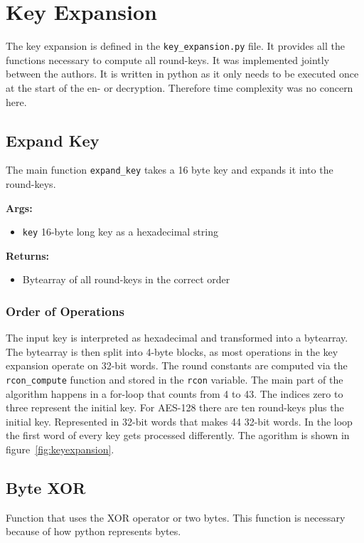 \chapter{Key Expansion}
\label{ch:key_expansion}
The key expansion is defined in the \lstinline{key_expansion.py} file. It provides all the functions necessary to compute all round-keys. It was implemented jointly between the authors. It is written in python as it only needs to be executed once at the start of the en- or decryption. Therefore time complexity was no concern here.

\section{Expand Key}
\label{ch:expand_key}
The main function  \lstinline{expand_key} takes a 16 byte key and expands it into the round-keys.

\textbf{Args:}
\begin{itemize}
  \item \lstinline{key} 16-byte long key as a hexadecimal string
\end{itemize}

\textbf{Returns:}
\begin{itemize}
  \item Bytearray of all round-keys in the correct order
\end{itemize}

\subsection{Order of Operations}
The input key is interpreted as hexadecimal and transformed into a bytearray. The bytearray is then split into 4-byte blocks, as most operations in the key expansion operate on 32-bit words. The round constants are computed via the  \lstinline{rcon_compute} function and stored in the  \lstinline{rcon} variable. The main part of the algorithm happens in a for-loop that counts from 4 to 43. The indices zero to three represent the initial key. For AES-128 there are ten round-keys plus the initial key. Represented in 32-bit words that makes 44 32-bit words. In the loop the first word of every key gets processed differently. The agorithm is shown in figure~\ref{fig:keyexpansion}.

\section{Byte XOR}
\label{ch:byte_xor}
Function that uses the XOR operator or two bytes. This function is necessary because of how python represents bytes.

